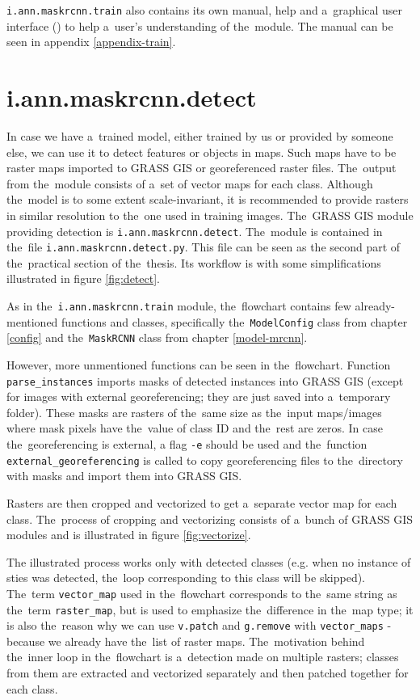 \verb|i.ann.maskrcnn.train| also contains its own manual, help and a~graphical 
user interface () to help a~user's understanding of the~module. The
manual can be seen in appendix \ref{appendix-train}.

\section{i.ann.maskrcnn.detect}
\label{detect-module}

In case we have a~trained model, either trained by us or provided by someone 
else, we can use it to detect features or objects in maps. Such maps have to be 
raster maps imported to GRASS GIS or georeferenced raster files. The~output
from the~module consists of a~set of vector 
maps for each class. Although the~model is to some extent scale-invariant, it is 
recommended to provide rasters in similar resolution to the~one used in
training images. The~GRASS GIS module providing detection is
\verb|i.ann.maskrcnn.detect|. The~module is contained in the~file
\verb|i.ann.maskrcnn.detect.py|. This file can be seen as the second part of
the~practical section of the~thesis. Its workflow is with some simplifications
illustrated in figure \ref{fig:detect}.

As in the~\verb|i.ann.maskrcnn.train| module, the~flowchart contains few 
already-mentioned functions and classes, specifically the~\verb|ModelConfig| 
class from chapter \ref{config} and the~\verb|MaskRCNN| class from chapter 
\ref{model-mrcnn}.

However, more unmentioned functions can be seen in the~flowchart. Function
\verb|parse_instances| imports masks of detected instances into GRASS GIS
(except for images with external georeferencing; they are just saved into
a~temporary folder). These masks are rasters of the~same size as the~input
maps/images where mask pixels have the~value of class ID and the~rest are
zeros. In case the~georeferencing is external, a flag \verb|-e| should be
used and the~function \verb|external_georeferencing| is 
called to copy georeferencing files to the~directory with masks and import them
into GRASS GIS.

Rasters are then cropped and vectorized to get a~separate vector map for each
class. The~process of cropping and vectorizing consists of a~bunch of GRASS GIS
modules and is illustrated in figure \ref{fig:vectorize}.

The illustrated process works only with detected classes (e.g. when no instance 
of sties was detected, the~loop corresponding to this class will be skipped). 
The~term \verb|vector_map| used in the~flowchart corresponds to the~same string 
as the~term \verb|raster_map|, but is used to emphasize the~difference in
the~map type; it is also the~reason why we can use \verb|v.patch| and 
\verb|g.remove| with \verb|vector_maps| - because we already have the~list of 
raster maps. The~motivation behind the~inner loop in the~flowchart is
a~detection made on multiple rasters; classes from them are extracted and 
vectorized separately and then patched together for each class.

